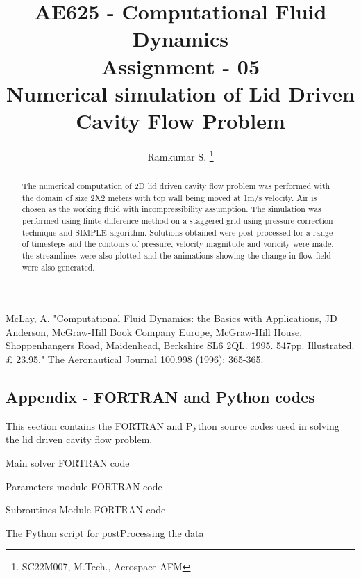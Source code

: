 \documentclass[conf]{new-aiaa}
\title{AE625 - Computational Fluid Dynamics \\ Assignment - 05 \\ Numerical simulation of Lid Driven Cavity Flow Problem}
\author{Ramkumar S. \footnote{SC22M007, M.Tech., Aerospace AFM }}
\affil{SC22M007, M.Tech. Aerospace - Aerodynamics and Flight Mechanics}
\begin{document}
\maketitle

\begin{abstract}
    The numerical computation of 2D lid driven cavity flow problem was performed
    with the domain of size 2X2 meters with top wall being moved at 1m/s velocity.
    Air is chosen as the working fluid with incompressibility assumption. The
    simulation was performed using finite difference method on a staggered grid
    using pressure correction technique and SIMPLE algorithm. Solutions obtained
    were post-processed for a range of timesteps and the contours of pressure,
    velocity magnitude and voricity were made. the streamlines were also
    plotted and the animations showing the change in flow field were also
    generated.
\end{abstract}




\begin{thebibliography}{2}
     McLay, A. "Computational Fluid Dynamics: the Basics with Applications, JD Anderson, McGraw-Hill Book Company Europe, McGraw-Hill House, Shoppenhangers Road, Maidenhead, Berkshire SL6 2QL. 1995. 547pp. Illustrated.£ 23.95." The Aeronautical Journal 100.998 (1996): 365-365.
\end{thebibliography}

\pagebreak

\begin{appendices}

    \section{Appendix - FORTRAN and Python codes}\label{numerical_code}
    This section contains the FORTRAN and Python source codes used in solving
    the lid driven cavity flow problem.

    \par Main solver FORTRAN code
    

    \par Parameters module FORTRAN code
    

    \par Subroutines Module FORTRAN code
    

    \par The Python script for postProcessing the data
    

\end{appendices}

\par
\center{**********}
\end{document}
